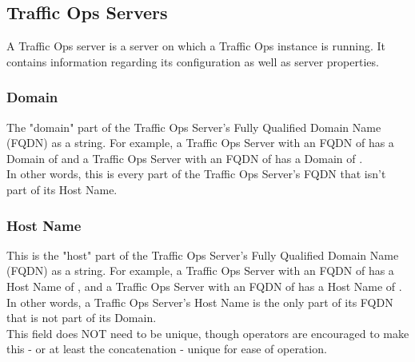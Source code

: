 %
%

\subsection{Traffic Ops Servers}
A Traffic Ops server is a server on which a Traffic Ops instance is running. It
contains information regarding its configuration as well as server properties.

\subsubsection{Domain}
The "domain" part of the Traffic Ops Server's Fully Qualified Domain Name (FQDN)
as a string. For example, a Traffic Ops Server with an FQDN of 
has a Domain of  and a Traffic Ops Server with an FQDN of
 has a Domain of .\\
In other words, this is every part of the Traffic Ops Server's FQDN that isn't
part of its Host Name.

\subsubsection{Host Name}
This is the "host" part of the Traffic Ops Server's Fully Qualified Domain Name
(FQDN) as a string. For example, a Traffic Ops Server with an FQDN of
 has a Host Name of , and a Traffic Ops Server
with an FQDN of  has a Host Name of
.\\
In other words, a Traffic Ops Server's Host Name is the only part of its FQDN
that is not part of its Domain.\\
This field does NOT need to be unique, though operators are encouraged to make
this - or at least the concatenation  -
unique for ease of operation.


